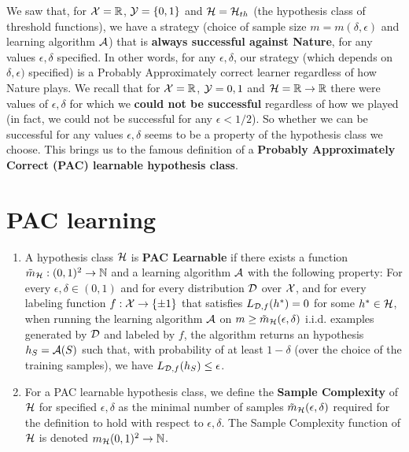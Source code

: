 {We saw that, for $\mathcal{X}=\mathbb{R}$, $\mathcal{Y}=\{0,1\}$ and $\mathcal{H}=\mathcal{H}_{th}$ (the hypothesis class of threshold functions), we have a strategy (choice of sample size $m=m(\delta,\epsilon)$ and learning algorithm $\mathcal{A}$) that is {\bf always successful against Nature}, for any values $\epsilon, \delta$ specified. In other words, for any  $\epsilon, \delta$, our strategy (which depends on $\delta,\epsilon)$ specified) is a Probably Approximately correct learner regardless of how Nature plays. 
\vspace{3mm}
We recall that for $\mathcal{X}=\mathbb{R}$, $\mathcal{Y}={0,1}$ and $\mathcal{H}=\mathbb{R}\to\mathbb{R}$ there were values of $\epsilon, \delta$ for which we {\bf could not be successful} regardless of how we played (in fact, we could not be successful for any $\epsilon<1/2$). So whether we can be successful for any values $\epsilon, \delta$ seems to be a property of the hypothesis class we choose. 
\vspace{3mm}
This brings us to the famous definition of a {\bf Probably Approximately Correct (PAC) learnable hypothesis class}.



\section{PAC learning}
\begin{definition}
	\begin{enumerate}
		\item
		A hypothesis class $\mathcal{H}$ is {\bf PAC Learnable} if there exists a function $\tilde{m}_{\mathcal{H}} : (0,1)^2 \to \mathbb{N}$ and a learning algorithm $\mathcal{A}$ with the following property:
		For every $\epsilon,\delta \in (0,1)$ and for every distribution $\mathcal{D}$ over $\mathcal{X}$, and for every labeling function 
		$f:\mathcal{X}\to\{\pm 1\}$ that satisfies $L_{\mathcal{D},f}(h^*)=0$ for some $h^*\in\mathcal{H}$, when running the learning algorithm $\mathcal{A}$ on $m\ge \tilde{m}_{\mathcal{H}}(\epsilon,\delta)$ i.i.d. examples generated by $\mathcal{D}$ and labeled by $f$, the algorithm returns an hypothesis $h_S=\mathcal{A}(S)$ such that, with probability of at least $1-\delta$ (over the choice of the training samples), we have
		$
		L_{\mathcal{D}, f}(h_S) \le \epsilon
		$. 
		\item For a PAC learnable hypothesis class, we define the {\bf Sample Complexity} of $\mathcal{H}$ for specified $\epsilon,\delta$ as the minimal number of samples $\tilde{m}_{\mathcal{H}}(\epsilon,\delta)$ required for the definition to hold with respect to $\epsilon,\delta$. The Sample Complexity function of $\mathcal{H}$ is denoted $m_{\mathcal{H}}(0,1)^2\to\mathbb{N}$.
	\end{enumerate}
\end{definition}

}
